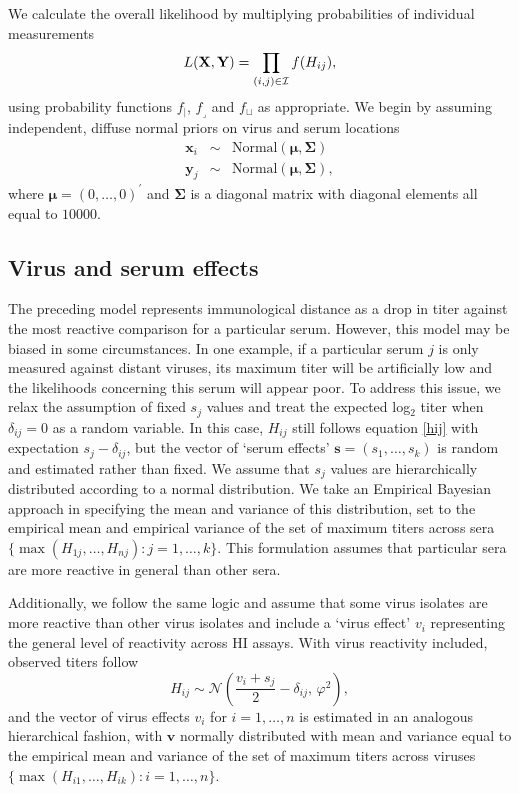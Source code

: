 \documentclass[11pt,oneside,letterpaper]{article}
\newcommand{\virus}{\mathbf{x}}						%
\newcommand{\serum}{\mathbf{y}}						%
\newcommand{\viruses}{\mathbf{X}}					%
\newcommand{\sera}{\mathbf{Y}}						%
\newcommand{\ve}{v}									%
\newcommand{\se}{s}									%
\newcommand{\ves}{\mathbf{v}}						%
\newcommand{\ses}{\mathbf{s}}						%
\newcommand{\point}{f_{\scriptscriptstyle \vert}}	%
\newcommand{\threshold}{f_{\textstyle \lrcorner}}	%
\newcommand{\interval}{f_{\sqcup}}					%
\newcommand{\mdssd}{\varphi}						%
\newcommand{\vn}{n}									%
\newcommand{\sn}{k}									%
\newcommand{\normal}{\mathcal{N}}					%
\begin{document}
We calculate the overall likelihood by multiplying probabilities of individual measurements
\begin{equation}  \label{bmds}
	L(\viruses,\sera) = \prod_{(i,j) \in \cal I} f(H_{ij}),
\end{equation}
using probability functions $\point$, $\threshold$ and $\interval$ as appropriate.
We begin by assuming independent, diffuse normal priors on virus and serum locations
\begin{eqnarray}
	\virus_i &\sim& \mathrm{Normal}(\boldsymbol{\mu},\boldsymbol{\Sigma}) \nonumber \\
	\serum_j &\sim& \mathrm{Normal}(\boldsymbol{\mu},\boldsymbol{\Sigma}),
\end{eqnarray}
where $\boldsymbol{\mu} = (0,\ldots,0)^{\prime}$ and $\boldsymbol{\Sigma}$ is a diagonal matrix with diagonal elements all equal to $10000$.

\subsection*{Virus and serum effects}

The preceding model represents immunological distance as a drop in titer against the most reactive comparison for a particular serum.
However, this model may be biased in some circumstances.
In one example, if a particular serum $j$ is only measured against distant viruses, its maximum titer will be artificially low and the likelihoods concerning this serum will appear poor. 
To address this issue, we relax the assumption of fixed $\se_j$ values and treat the expected log$_2$ titer when $\delta_{ij}=0$ as a random variable.
In this case, $H_{ij}$ still follows equation \ref{hij} with expectation $\se_j - \delta_{ij}$, but the vector of `serum effects' $\ses = (\se_1,\ldots,\se_{\sn})$ is random and estimated rather than fixed.
We assume that $\se_j$ values are hierarchically distributed according to a normal distribution.   
We take an Empirical Bayesian approach in specifying the mean and variance of this distribution, set to the empirical mean and empirical variance of the set of maximum titers across sera $\{ \max ( H_{1j},\ldots,H_{\vn j} ) : j = 1,\ldots,\sn \}$.
This formulation assumes that particular sera are more reactive in general than other sera.

Additionally, we follow the same logic and assume that some virus isolates are more reactive than other virus isolates and include a `virus effect' $\ve_i$ representing the general level of reactivity across HI assays. 
With virus reactivity included, observed titers follow
\begin{equation}
	H_{ij} \sim \normal \left( \frac{\ve_i+\se_j}{2} - \delta_{ij}, \, \mdssd^2 \right),
\end{equation}
and the vector of virus effects $\ve_i$ for $i = 1,\ldots, \vn$ is estimated in an analogous hierarchical fashion, with $\ves$ normally distributed with mean and variance equal to the empirical mean and variance of the set of maximum titers across viruses $\{ \max ( H_{i1},\ldots,H_{i \sn} ) : i = 1,\ldots,\vn \}$.
\end{document}
